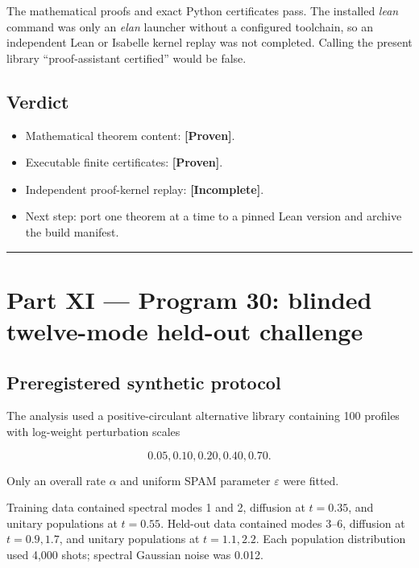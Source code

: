 \documentclass[11pt,a4paper,openany]{report}
\newcommand{\statusProven}{\textcolor{fingreen}{[Proven]}}
\begin{document}
The mathematical proofs and exact Python certificates pass. The installed \emph{lean} command was only an \emph{elan} launcher without a configured toolchain, so an independent Lean or Isabelle kernel replay was not completed. Calling the present library “proof-assistant certified” would be false.

\section{Verdict}

\begin{itemize}
\item 
Mathematical theorem content: \textbf{\statusProven{}}.

\item 
Executable finite certificates: \textbf{\statusProven{}}.

\item 
Independent proof-kernel replay: \textbf{[Incomplete]}.

\item 
Next step: port one theorem at a time to a pinned Lean version and archive the build manifest.

\end{itemize}

\par\medskip\hrule\medskip

\chapter{Part XI — Program 30: blinded twelve-mode held-out challenge}

\section{Preregistered synthetic protocol}

The analysis used a positive-circulant alternative library containing 100 profiles with log-weight perturbation scales

\[
0.05,0.10,0.20,0.40,0.70.
\]

Only an overall rate \(\alpha\) and uniform SPAM parameter \(\varepsilon\) were fitted.

Training data contained spectral modes 1 and 2, diffusion at \(t=0.35\), and unitary populations at \(t=0.55\). Held-out data contained modes 3–6, diffusion at \(t=0.9,1.7\), and unitary populations at \(t=1.1,2.2\). Each population distribution used 4,000 shots; spectral Gaussian noise was 0.012.
\end{document}
